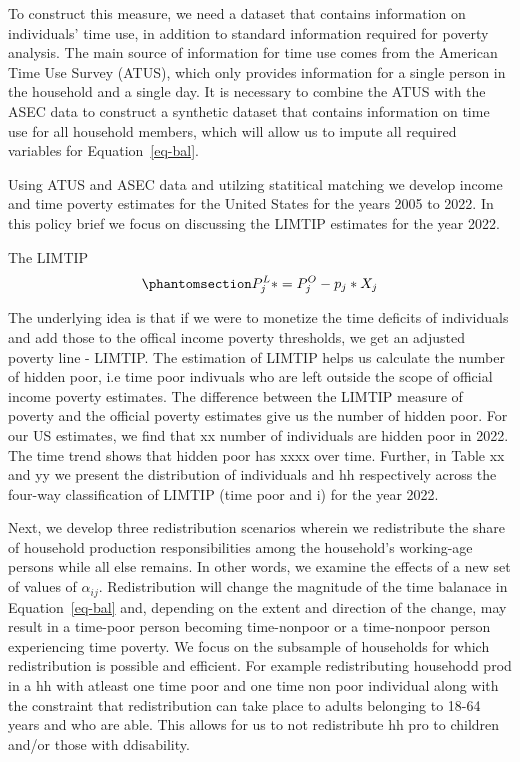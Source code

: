 \documentclass[
  11pt,
]{article}
\begin{document}
To construct this measure, we need a dataset that contains information
on individuals' time use, in addition to standard information required
for poverty analysis. The main source of information for time use comes
from the American Time Use Survey (ATUS), which only provides
information for a single person in the household and a single day. It is
necessary to combine the ATUS with the ASEC data to construct a
synthetic dataset that contains information on time use for all
household members, which will allow us to impute all required variables
for Equation~\ref{eq-bal}.

Using ATUS and ASEC data and utilzing statitical matching we develop
income and time poverty estimates for the United States for the years
2005 to 2022. In this policy brief we focus on discussing the LIMTIP
estimates for the year 2022.

The LIMTIP
\begin{equation}\phantomsection\label{eq-limtip}{P_{j}^L* = P_{j}^O- p_{j}*X_{j}
}\end{equation}

The underlying idea is that if we were to monetize the time deficits of
individuals and add those to the offical income poverty thresholds, we
get an adjusted poverty line - LIMTIP. The estimation of LIMTIP helps us
calculate the number of hidden poor, i.e time poor indivuals who are
left outside the scope of official income poverty estimates. The
difference between the LIMTIP measure of poverty and the official
poverty estimates give us the number of hidden poor. For our US
estimates, we find that xx number of individuals are hidden poor in
2022. The time trend shows that hidden poor has xxxx over time. Further,
in Table xx and yy we present the distribution of individuals and hh
respectively across the four-way classification of LIMTIP (time poor and
i) for the year 2022.

Next, we develop three redistribution scenarios wherein we redistribute
the share of household production responsibilities among the household's
working-age persons while all else remains. In other words, we examine
the effects of a new set of values of \(\alpha_{ij}\). Redistribution
will change the magnitude of the time balanace in Equation~\ref{eq-bal}
and, depending on the extent and direction of the change, may result in
a time-poor person becoming time-nonpoor or a time-nonpoor person
experiencing time poverty. We focus on the subsample of households for
which redistribution is possible and efficient. For example
redistributing househodd prod in a hh with atleast one time poor and one
time non poor individual along with the constraint that redistribution
can take place to adults belonging to 18-64 years and who are able. This
allows for us to not redistribute hh pro to children and/or those with
ddisability.
\end{document}
